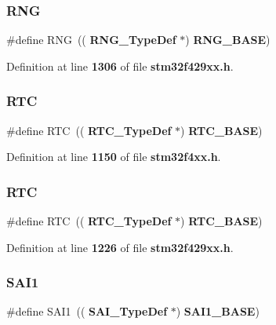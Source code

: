 \subsubsection{R\+NG\hspace{0.1cm}{\footnotesize\ttfamily [2/2]}}
{\footnotesize\ttfamily \#define R\+NG~((\textbf{ R\+N\+G\+\_\+\+Type\+Def} $\ast$) \textbf{ R\+N\+G\+\_\+\+B\+A\+SE})}



Definition at line \textbf{ 1306} of file \textbf{ stm32f429xx.\+h}.

\mbox{\label{group__Peripheral__declaration_ga5359a088f5d8b20ce74d920e46059304}} 
\subsubsection{R\+TC\hspace{0.1cm}{\footnotesize\ttfamily [1/2]}}
{\footnotesize\ttfamily \#define R\+TC~((\textbf{ R\+T\+C\+\_\+\+Type\+Def} $\ast$) \textbf{ R\+T\+C\+\_\+\+B\+A\+SE})}



Definition at line \textbf{ 1150} of file \textbf{ stm32f4xx.\+h}.

\mbox{\label{group__Peripheral__declaration_ga5359a088f5d8b20ce74d920e46059304}} 
\subsubsection{R\+TC\hspace{0.1cm}{\footnotesize\ttfamily [2/2]}}
{\footnotesize\ttfamily \#define R\+TC~((\textbf{ R\+T\+C\+\_\+\+Type\+Def} $\ast$) \textbf{ R\+T\+C\+\_\+\+B\+A\+SE})}



Definition at line \textbf{ 1226} of file \textbf{ stm32f429xx.\+h}.

\mbox{\label{group__Peripheral__declaration_gaa878b214698fcf74a3268d07562abbb2}} 
\subsubsection{S\+A\+I1}
{\footnotesize\ttfamily \#define S\+A\+I1~((\textbf{ S\+A\+I\+\_\+\+Type\+Def} $\ast$) \textbf{ S\+A\+I1\+\_\+\+B\+A\+SE})}



